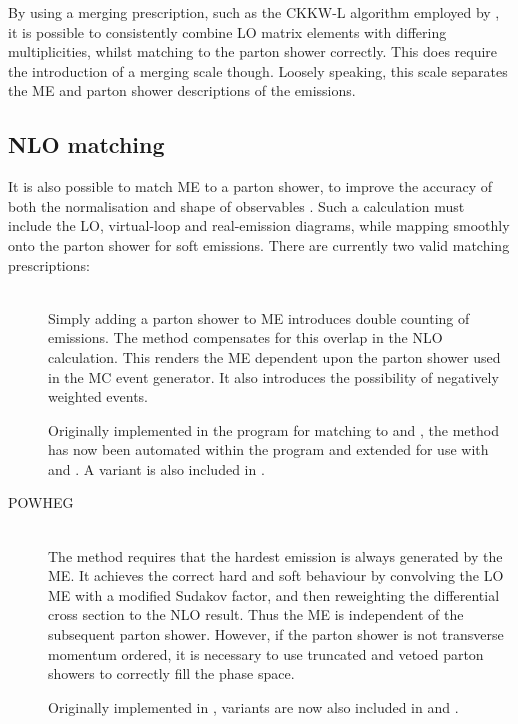By using a merging prescription, such as the CKKW-L algorithm \cite{CKKW,Lonnblad:2002} 
employed by \sherpa, it is possible to consistently combine \ac{LO} matrix elements 
with differing multiplicities, whilst matching to the parton shower correctly. This does 
require the introduction of a merging scale though. Loosely speaking, this scale separates
the \ac{ME} and parton shower descriptions of the emissions.



\subsection{NLO matching}
\label{sec:mc:matching}

It is also possible to match  \ac{ME} to a parton shower, to improve the accuracy
of both the normalisation and shape of observables \cite{Nason:2012}. Such a calculation 
must include the \ac{LO}, virtual-loop and real-emission diagrams, while mapping smoothly 
onto the parton shower for soft emissions. There are currently two valid matching 
prescriptions:

\begin{description}
\item[\mcatnlo] \hfill \\
	Simply adding a parton shower to  \ac{ME} introduces double counting of 
	emissions. The \mcatnlo method compensates for this overlap in the \ac{NLO} 
	calculation. This renders the \ac{ME} dependent upon the parton shower used in the 
	\ac{MC} event generator. It also introduces the possibility of negatively weighted 
	events.

	Originally implemented in the \mcatnlo program for matching to \fherwig 
	\cite{MCatNLO-Herwig} and \herwigpp \cite{MCatNLO-Herwig++}, the method has now been 
	automated within the \amcatnlo program \cite{aMCatNLO} and extended for use with 
	 and  \cite{MCatNLO-Pythia}. A variant is also included in 
	\sherpa.
\item[POWHEG] \hfill \\
	The \powhegmethod method requires that the hardest emission is always generated by 
	the \ac{ME}. It achieves the correct hard and soft behaviour by convolving the \ac{LO}
	\ac{ME} with a modified Sudakov factor, and then reweighting the differential cross 
	section to the \ac{NLO} result. Thus the \ac{ME} is independent of the subsequent 
	parton shower. However, if the parton shower is not transverse momentum ordered, it is
	necessary to use truncated and vetoed parton showers to correctly fill the phase 
	space.

	Originally implemented in \powhegbox \cite{Powheg-method,Powheg-method2,PowhegBox}, 
	variants are now also included in \herwigpp and \sherpa.
\end{description}



